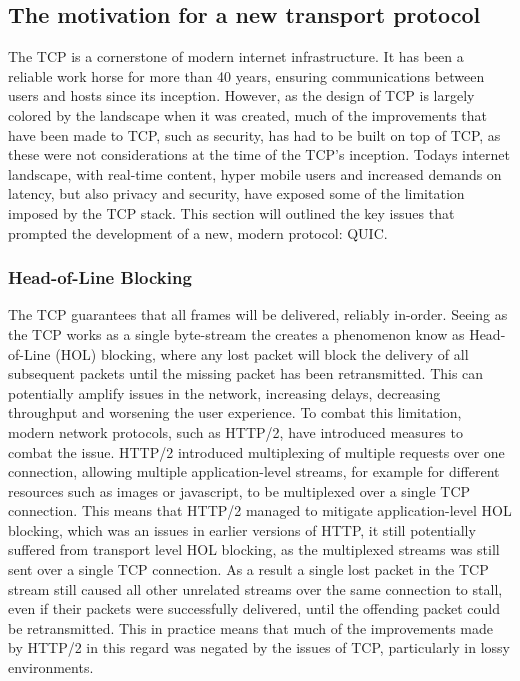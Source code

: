 \documentclass[english, 12pt, a4paper, elec, utf8, a-2b, online]{aaltothesis}
\begin{document}
\subsection{The motivation for a new transport protocol \label{quic_motivation}}
The TCP is a cornerstone of modern internet infrastructure. It has been a reliable
work horse for more than 40 years, ensuring communications between users and hosts
since its inception. However, as the design of TCP is largely colored by the
landscape when it was created, much of the improvements that have been made to TCP,
such as security, has had to be built on top of TCP, as these were not considerations
at the time of the TCP's inception. Todays internet landscape, with real-time content,
hyper mobile users and increased demands on latency, but also privacy and security, have exposed
some of the limitation imposed by the TCP stack. This section will outlined the
key issues that prompted the development of a new, modern protocol: QUIC.

\subsubsection{Head-of-Line Blocking}
\label{sec:hol}
The TCP guarantees that all frames will be delivered, reliably in-order. Seeing
as the TCP works as a single byte-stream the creates a phenomenon know as
Head-of-Line (HOL) blocking, where any lost packet will block the delivery of
all subsequent packets until the missing packet has been retransmitted. This
can potentially amplify issues in the network, increasing delays, decreasing
throughput and worsening the user experience. To combat this limitation, modern
network protocols, such as HTTP/2\cite{rfc9113}, have introduced measures to
combat the issue. HTTP/2 introduced multiplexing of multiple requests over one
connection, allowing multiple application-level streams, for example for different
resources such as images or javascript, to be multiplexed over a single TCP
connection. This means that HTTP/2 managed to mitigate application-level HOL
blocking, which was an issues in earlier versions of HTTP, it still potentially
suffered from transport level HOL blocking, as the multiplexed streams was still
sent over a single TCP connection. As a result a single lost packet in the TCP
stream still caused all other unrelated streams over the same connection to stall,
even if their packets were successfully delivered, until the offending packet
could be retransmitted. This in practice means that much of the improvements made
by HTTP/2 in this regard was negated by the issues of TCP, particularly in lossy
environments\cite{http2_vs_1}.
\end{document}
